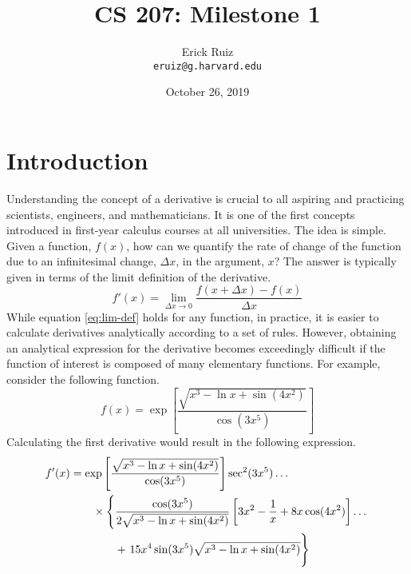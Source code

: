 
\lstset{language=Python}

    \title{CS 207: Milestone 1}
    \author{Erick Ruiz\\ \texttt{eruiz@g.harvard.edu}}
    \date{October 26, 2019}
    \maketitle
    
    \section*{Introduction}
    Understanding the concept of a derivative is crucial to all aspiring and 
    practicing scientists, engineers, and mathematicians. It is one of the first
    concepts introduced in first-year calculus courses at all universities. The 
    idea is simple. Given a function, $f(x)$, how can we quantify the rate of 
    change of the function due to an infinitesimal change, $\Delta x$, in the 
    argument, $x$? The answer is typically given in terms of the limit 
    definition of the derivative.
    \begin{equation}
        f'(x) = \lim_{\Delta x\rightarrow 0} \frac{f(x+\Delta x)-f(x)}{\Delta x}
        \label{eq:lim-def}
    \end{equation}
    While equation \eqref{eq:lim-def} holds for any function, in practice, it is
    easier to calculate derivatives analytically according to a set of rules. 
    However, obtaining an analytical expression for the derivative becomes 
    exceedingly difficult if the function of interest is composed of many 
    elementary functions. For example, consider the following function.
    \begin{equation}
        f(x) = \exp\left[\frac{\sqrt{x^3 - \ln x + \sin(4x^2)}}{\cos(3x^5)}\right]
        \label{eq:ugly-eq}
    \end{equation}
    Calculating the first derivative would result in the following expression.
    \begin{align}
        f'(x) &= \exp\left[\frac{\sqrt{x^3 - \ln x + \sin(4x^2)}}{\cos(3x^5)}\right]
        \sec^2(3x^5)\dots\nonumber\\
        &\qquad\times\left\{
        \frac{\cos(3x^5)}{2\sqrt{x^3 - \ln x + \sin(4x^2)}}
        \left[3x^2-\frac{1}{x}+8x\cos(4x^2)\right]\dots\right.\nonumber\\
        &\qquad\qquad+
        \left.\vphantom{\frac{\cos(3x^5)}{2\sqrt{x^3 - \ln x + \sin(4x^2)}}}
        15x^4\sin(3x^5)\sqrt{x^3 - \ln x + \sin(4x^2)}
        \right\}
    \end{align}
